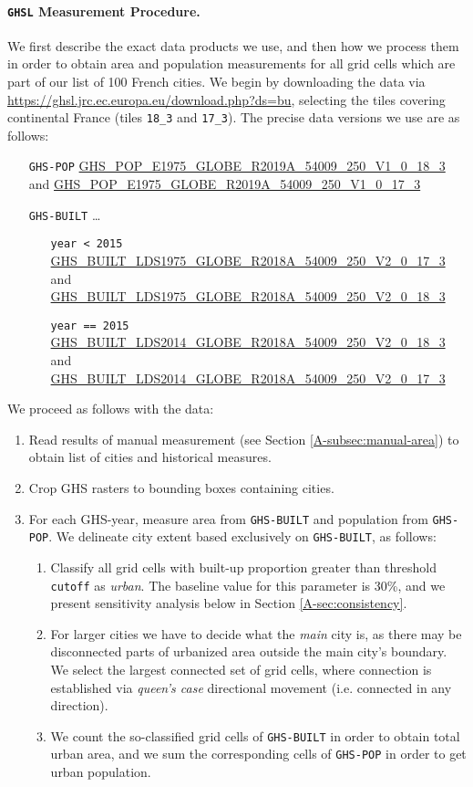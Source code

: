 \documentclass[11pt]{report}
\begin{document}
\paragraph{\texttt{GHSL} Measurement Procedure.} We first describe the exact data products we use, and then how we process them in order to obtain area and population measurements for all grid cells which are part of our list of 100 French cities. We begin by downloading the data via \url{https://ghsl.jrc.ec.europa.eu/download.php?ds=bu}, selecting the tiles covering continental France (tiles \texttt{18\_3} and \texttt{17\_3}). The precise data versions we use are as follows: 

\begin{itemize}
	\item[\texttt{GHS-POP}] \url{GHS_POP_E1975_GLOBE_R2019A_54009_250_V1_0_18_3} and \url{GHS_POP_E1975_GLOBE_R2019A_54009_250_V1_0_17_3}
	\item[\texttt{GHS-BUILT}] \dots
	\begin{itemize}
		\item[\texttt{year < 2015}] \url{GHS_BUILT_LDS1975_GLOBE_R2018A_54009_250_V2_0_17_3} and \url{GHS_BUILT_LDS1975_GLOBE_R2018A_54009_250_V2_0_18_3}
		\item[\texttt{year == 2015}] \url{GHS_BUILT_LDS2014_GLOBE_R2018A_54009_250_V2_0_18_3} and \url{GHS_BUILT_LDS2014_GLOBE_R2018A_54009_250_V2_0_17_3}
	\end{itemize} 
\end{itemize}

We proceed as follows with the data:

\begin{enumerate}
	\item Read results of manual measurement (see Section \ref{A-subsec:manual-area}) to obtain list of cities and historical measures.
	\item Crop GHS rasters to bounding boxes containing cities.
	\item For each GHS-year, measure area from \texttt{GHS-BUILT} and population from \texttt{GHS-POP}. We delineate city extent based exclusively on \texttt{GHS-BUILT}, as follows:
	\begin{enumerate}
		\item Classify all grid cells with built-up proportion greater than threshold \texttt{cutoff} as \emph{urban}. The baseline value for this parameter is 30\%, and we present sensitivity analysis below in Section \ref{A-sec:consistency}.
		\item For larger cities we have to decide what the \emph{main} city is, as there may be disconnected parts of urbanized area outside the main city's boundary. We select the largest connected set of grid cells, where connection is established via \emph{queen's case} directional movement (i.e. connected in any direction).
		\item We count the so-classified grid cells of \texttt{GHS-BUILT} in order to obtain total urban area, and we sum the corresponding cells of \texttt{GHS-POP} in order to get urban population.
	\end{enumerate}
\end{enumerate}
\end{document}
